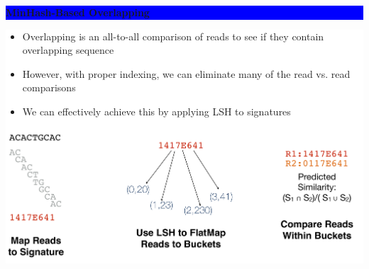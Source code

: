 \documentclass[11pt]{a0poster}
\begin{document}
{\begin{minipage}[t][2045pt][t]{\linewidth}
\begin{minipage}{0.6\linewidth}
\vspace{70pt}
\colorbox{Blue}{
\begin{minipage}[t]{\linewidth}
\vspace{30pt}
\begin{center}
\Huge \bf \color{White} MinHash-Based Overlapping
\end{center}
\vspace{17pt}
\end{minipage}
}
\colorbox{White}{
\begin{minipage}[t][470pt][t]{\linewidth}
\begin{minipage}{0.3\linewidth}
\LARGE
\color{Blue}
\begin{itemize}
\item Overlapping is an all-to-all comparison of reads to see if they contain overlapping sequence
\item However, with proper indexing, we can eliminate many of the read vs. read comparisons
\item We can effectively achieve this by applying LSH to signatures
\end{itemize}
\end{minipage}
\begin{minipage}{0.03\linewidth}
\hfill
\pagebreak
\end{minipage}
\begin{minipage}{0.64\linewidth}
\begin{center}
\includegraphics[width=0.95\linewidth]{minhash.pdf}
\end{center}
\end{minipage}
\pagebreak
\end{minipage}
}


\end{minipage}
\end{minipage}}
\end{document}
